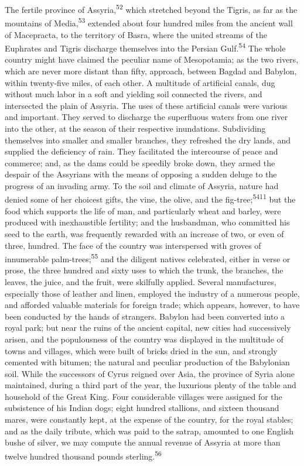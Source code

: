 The fertile province of Assyria,\textsuperscript{52} which stretched beyond the
Tigris, as far as the mountains of Media,\textsuperscript{53} extended about four
hundred miles from the ancient wall of Macepracta, to the
territory of Basra, where the united streams of the Euphrates and
Tigris discharge themselves into the Persian Gulf.\textsuperscript{54} The whole
country might have claimed the peculiar name of Mesopotamia; as
the two rivers, which are never more distant than fifty,
approach, between Bagdad and Babylon, within twenty-five miles,
of each other. A multitude of artificial canals, dug without much
labor in a soft and yielding soil connected the rivers, and
intersected the plain of Assyria. The uses of these artificial
canals were various and important. They served to discharge the
superfluous waters from one river into the other, at the season
of their respective inundations. Subdividing themselves into
smaller and smaller branches, they refreshed the dry lands, and
supplied the deficiency of rain. They facilitated the intercourse
of peace and commerce; and, as the dams could be speedily broke
down, they armed the despair of the Assyrians with the means of
opposing a sudden deluge to the progress of an invading army. To
the soil and climate of Assyria, nature had denied some of her
choicest gifts, the vine, the olive, and the fig-tree;\textsuperscript{5411} but
the food which supports the life of man, and particularly wheat
and barley, were produced with inexhaustible fertility; and the
husbandman, who committed his seed to the earth, was frequently
rewarded with an increase of two, or even of three, hundred. The
face of the country was interspersed with groves of innumerable
palm-trees;\textsuperscript{55} and the diligent natives celebrated, either in
verse or prose, the three hundred and sixty uses to which the
trunk, the branches, the leaves, the juice, and the fruit, were
skilfully applied. Several manufactures, especially those of
leather and linen, employed the industry of a numerous people,
and afforded valuable materials for foreign trade; which appears,
however, to have been conducted by the hands of strangers.
Babylon had been converted into a royal park; but near the ruins
of the ancient capital, new cities had successively arisen, and
the populousness of the country was displayed in the multitude of
towns and villages, which were built of bricks dried in the sun,
and strongly cemented with bitumen; the natural and peculiar
production of the Babylonian soil. While the successors of Cyrus
reigned over Asia, the province of Syria alone maintained, during
a third part of the year, the luxurious plenty of the table and
household of the Great King. Four considerable villages were
assigned for the subsistence of his Indian dogs; eight hundred
stallions, and sixteen thousand mares, were constantly kept, at
the expense of the country, for the royal stables; and as the
daily tribute, which was paid to the satrap, amounted to one
English bushe of silver, we may compute the annual revenue of
Assyria at more than twelve hundred thousand pounds sterling.\textsuperscript{56}

